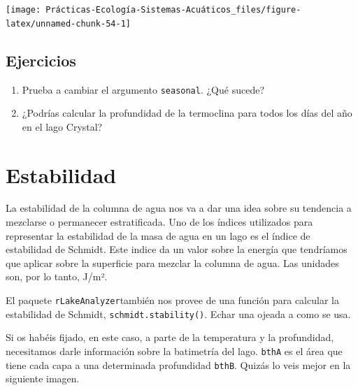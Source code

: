 \documentclass[
]{book}
\newcommand{\passthrough}[1]{#1}
\providecommand{\tightlist}{%
  \setlength{\itemsep}{0pt}\setlength{\parskip}{0pt}}
\begin{document}
\texttt{[image: Prácticas-Ecología-Sistemas-Acuáticos\_files/figure-latex/unnamed-chunk-54-1]}

\hypertarget{ejercicios-4}{%
\subsection{Ejercicios}\label{ejercicios-4}}

\begin{enumerate}
\def\labelenumi{\arabic{enumi}.}
\tightlist
\item
  Prueba a cambiar el argumento \passthrough{\lstinline!seasonal!}. ¿Qué sucede?
\item
  ¿Podrías calcular la profundidad de la termoclina para todos los días del año en el lago Crystal?
\end{enumerate}

\hypertarget{estabilidad}{%
\section{Estabilidad}\label{estabilidad}}

La estabilidad de la columna de agua nos va a dar una idea sobre su tendencia a mezclarse o permanecer estratificada. Uno de los índices utilizados para representar la estabilidad de la masa de agua en un lago es el índice de estabilidad de Schmidt. Este indice da un valor sobre la energía que tendríamos que aplicar sobre la superficie para mezclar la columna de agua. Las unidades son, por lo tanto, J/m².

El paquete \passthrough{\lstinline!rLakeAnalyzer!}también nos provee de una función para calcular la estabilidad de Schmidt, \passthrough{\lstinline!schmidt.stability()!}. Echar una ojeada a como se usa.

Si os habéis fijado, en este caso, a parte de la temperatura y la profundidad, necesitamos darle información sobre la batimetría del lago. \passthrough{\lstinline!bthA!} es el área que tiene cada capa a una determinada profundidad \passthrough{\lstinline!bthB!}. Quizás lo veis mejor en la siguiente imagen.
\end{document}
